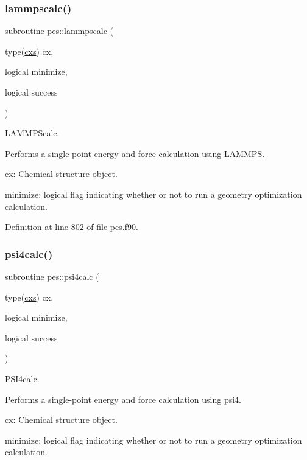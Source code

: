 \subsubsection{\texorpdfstring{lammpscalc()}{lammpscalc()}}
{\footnotesize\ttfamily subroutine pes\+::lammpscalc (\begin{DoxyParamCaption}\item[{type(\mbox{\hyperlink{structchemstr_1_1cxs}{cxs}})}]{cx,  }\item[{logical}]{minimize,  }\item[{logical}]{success }\end{DoxyParamCaption})}



L\+A\+M\+M\+P\+Scalc. 

Performs a single-\/point energy and force calculation using L\+A\+M\+M\+PS.


\begin{DoxyItemize}
\item cx\+: Chemical structure object.
\item minimize\+: logical flag indicating whether or not to run a geometry optimization calculation. 
\end{DoxyItemize}

Definition at line 802 of file pes.\+f90.

\mbox{\label{namespacepes_af090baa63d75251c8a0d59fa6a0e5ab7}} 
\subsubsection{\texorpdfstring{psi4calc()}{psi4calc()}}
{\footnotesize\ttfamily subroutine pes\+::psi4calc (\begin{DoxyParamCaption}\item[{type(\mbox{\hyperlink{structchemstr_1_1cxs}{cxs}})}]{cx,  }\item[{logical}]{minimize,  }\item[{logical}]{success }\end{DoxyParamCaption})}



P\+S\+I4calc. 

Performs a single-\/point energy and force calculation using psi4.


\begin{DoxyItemize}
\item cx\+: Chemical structure object.
\item minimize\+: logical flag indicating whether or not to run a geometry optimization calculation. 
\end{DoxyItemize}

